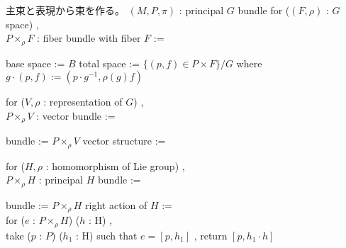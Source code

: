 \begin{Definition}
\itemnote
  主束と表現から束を作る。
\itemwhen \((M , P , \pi)\) : principal \(G\) bundle
\itemdefi
  for (\((F , \rho)\) : \(G\) space) ,\\
  \(P \times_{\rho} F\) : fiber bundle with fiber \(F\) :=
  \begin{itemize}
    \itemenum base space := \(B\)
    \itemenum total space := \(\{(p , f) \in P \times F\} / G\) where \\
      \(g \cdot (p , f) := (p \cdot g^{-1} , \rho(g) f)\)
  \end{itemize}
\itemdefi
  for (\(V , \rho\) : representation of \(G\)) ,\\
  \(P \times_{\rho} V\) : vector bundle :=
  \begin{itemize}
    \itemenum bundle := \(P \times_{\rho} V\)
    \itemenum vector structure := 
  \end{itemize}
\itemdefi
  for (\(H , \rho\) : homomorphism of Lie group) ,\\
  \(P \times_{\rho} H\) : principal \(H\) bundle :=
  \begin{itemize}
    \itemenum bundle := \(P \times_{\rho} H\)
    \itemenum right action of \(H\) := \\
    for (\(e\) : \(P \times_{\rho} H\)) (\(h\) : H) ,\\
    take (\(p\) : \(P\)) (\(h_1\) : H) such that \(e = [p , h_1]\) ,
    return \([p , h_1 \cdot h]\)
  \end{itemize}
\end{Definition}

